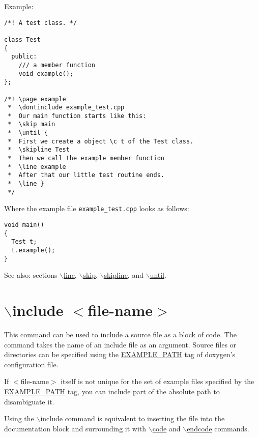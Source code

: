 \begin{Desc}
\item[Example:]

\begin{VerbInclude}\begin{verbatim}
/*! A test class. */

class Test
{
  public:
    /// a member function
    void example();
};

/*! \page example
 *  \dontinclude example_test.cpp
 *  Our main function starts like this:
 *  \skip main
 *  \until {
 *  First we create a object \c t of the Test class.
 *  \skipline Test
 *  Then we call the example member function 
 *  \line example
 *  After that our little test routine ends.
 *  \line }
 */
\end{verbatim}
\end{VerbInclude}
 Where the example file {\tt example\_\-test.cpp} looks as follows: 

\begin{VerbInclude}\begin{verbatim}void main()
{
  Test t;
  t.example();
}
\end{verbatim}
\end{VerbInclude}
 \end{Desc}
\begin{Desc}
\item[See also:]sections \hyperlink{commands_cmdline}{$\backslash$line}, \hyperlink{commands_cmdskip}{$\backslash$skip}, \hyperlink{commands_cmdskipline}{$\backslash$skipline}, and \hyperlink{commands_cmduntil}{$\backslash$until}.\end{Desc}


 \hypertarget{commands_cmdinclude}{}\section{$\backslash$include $<$file-name$>$}\label{commands_cmdinclude}
 This command can be used to include a source file as a block of code. The command takes the name of an include file as an argument. Source files or directories can be specified using the \hyperlink{config_cfg_example_path}{EXAMPLE\_\-PATH} tag of doxygen's configuration file.

If $<$file-name$>$ itself is not unique for the set of example files specified by the \hyperlink{config_cfg_example_path}{EXAMPLE\_\-PATH} tag, you can include part of the absolute path to disambiguate it.

Using the $\backslash$include command is equivalent to inserting the file into the documentation block and surrounding it with \hyperlink{commands_cmdcode}{$\backslash$code} and \hyperlink{commands_cmdendcode}{$\backslash$endcode} commands.

